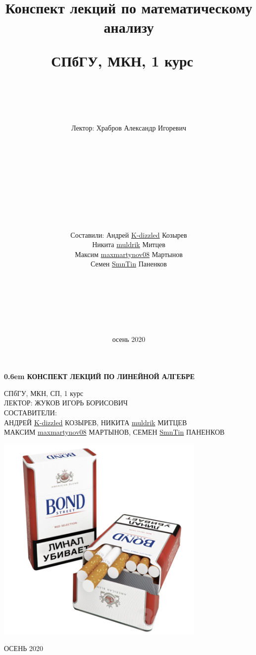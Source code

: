 \documentclass[12pt,letterpaper]{report}
\title{Конспект лекций по математическому анализу

СПбГУ, МКН, 1 курс
\ \\
\ \\ \ \\
}
\author{Лектор: Храбров Александр Игоревич \\
\ \\ \ \\ \ \\ \ \\ \ \\ \ \\ \ \\ \ \\
\ \\ 
\begin{flushright}
Составили: Андрей \href{https://github.com/K-dizzled}{K-dizzled} Козырев \\ Никита  \href{https://github.com/muldrik}{muldrik} Митцев \\ Максим \href{https://github.com/maxmartynov08}{maxmartynov08} Мартынов \\ Семен \href{https://github.com/SmnTin}{SmnTin} Паненков
\end{flushright}
\ \\
\ \\
\ \\
\ \\
\ \\
\ \\}
\date{осень 2020}
\theoremstyle{definition}
\begin{document}
\clearpage
\newcommand\nbvspace[1][3]{\vspace*{\stretch{#1}}}
\newcommand\nbstretchyspace{\spaceskip0.5em plus 0.25em minus 0.25em}
\newcommand{\nbtitlestretch}{\spaceskip0.6em}
\pagestyle{empty}
\begin{center}
\bfseries
\nbvspace[1]
\Huge
{\nbtitlestretch\huge
КОНСПЕКТ ЛЕКЦИЙ ПО ЛИНЕЙНОЙ АЛГЕБРЕ}

\nbvspace[1]
\normalsize

СПбГУ, МКН, СП, 1 курс\\
ЛЕКТОР: ЖУКОВ ИГОРЬ БОРИСОВИЧ
\nbvspace[1]
\\
\Large СОСТАВИТЕЛИ:\\[0.5em]
\footnotesize АНДРЕЙ \href{https://github.com/K-dizzled}{K-dizzled} КОЗЫРЕВ, НИКИТА  \href{https://github.com/muldrik}{muldrik} МИТЦЕВ \\ МАКСИМ \href{https://github.com/maxmartynov08}{maxmartynov08} МАРТЫНОВ, СЕМЕН \href{https://github.com/SmnTin}{SmnTin} ПАНЕНКОВ

\nbvspace[2]

\includegraphics[width=4.0in]{./images/linal_kills.png}
\nbvspace[3]
\normalsize

\large
ОСЕНЬ 2020
\nbvspace[1]
\end{center}
\newpage
\pagestyle{plain}
\fi
\tableofcontents
\newpage
\end{document}
